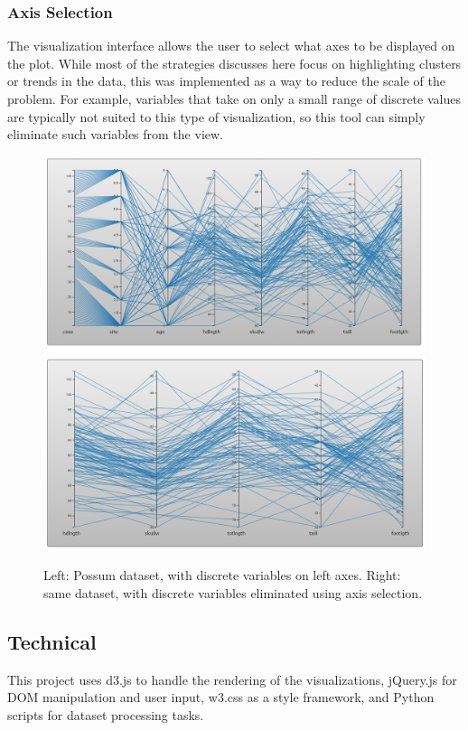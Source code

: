 \documentclass[]{article}
\begin{document}
		\subsubsection{Axis Selection}
		The visualization interface allows the user to select what axes to be displayed on the plot. While most of the strategies discusses here focus on highlighting clusters or trends in the data, this was implemented as a way to reduce the scale of the problem. For example, variables that take on only a small range of discrete values are typically not suited to this type of visualization\cite{kosara}, so this tool can simply eliminate such variables from the view.
		\begin{figure}[h]
			\includegraphics[width=\linewidth/2]{possum_bad.png}
			\includegraphics[width=\linewidth/2]{possum_good.png}
			\caption{Left: Possum dataset\cite{datasets}, with discrete variables on left axes. Right: same dataset, with discrete variables eliminated using axis selection.}
			\label{fig:Axis}
		\end{figure}
	\subsection{Technical}
		This project uses d3.js to handle the rendering of the visualizations, jQuery.js for DOM manipulation and user input, w3.css as a style framework, and Python scripts for dataset processing tasks.
\end{document}
